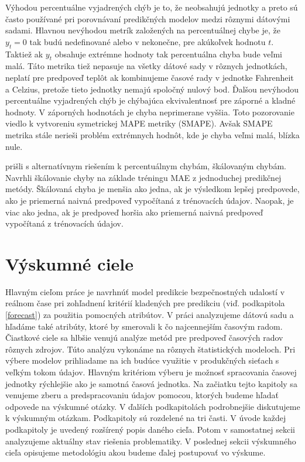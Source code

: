 \documentclass[thesismargins, thesislinespacing, openright, upjsfrontpage, combineabstracts]{rnthesis}
\begin{document}
Výhodou percentuálne vyjadrených chýb je to, že neobsahujú jednotky a preto sú často používané pri porovnávaní predikčných modelov medzi rôznymi dátovými sadami. Hlavnou nevýhodou metrík založených na percentuálnej chybe je, že $y_{t} = 0$ tak budú nedefinované alebo v nekonečne, pre akúkoľvek hodnotu $t$. Taktiež ak $y_{t}$ obsahuje extrémne hodnoty tak percentuálna chyba bude veľmi malá. Táto metrika tiež nepasuje na všetky dátové sady v rôznych jednotkách, neplatí pre predpoveď teplôt ak kombinujeme časové rady v jednotke Fahrenheit a Celzius, pretože tieto jednotky nemajú spoločný nulový bod. Ďalšou nevýhodou percentuálne vyjadrených chýb je chýbajúca ekvivalentnosť pre záporné a kladné hodnoty. V záporných hodnotách je chyba neprimerane vyššia. Toto pozorovanie viedlo k vytvoreniu symetrickej MAPE metriky \cite{armstrong1985crystal} (SMAPE). Avšak SMAPE metrika stále nerieši problém extrémnych hodnôt, kde je chyba veľmi malá, blízka nule. 

\cite{hyndman2006another} prišli s alternatívnym riešením k percentuálnym chybám, škálovaným chybám. Navrhli škálovanie chyby na základe tréningu MAE z jednoduchej predikčnej metódy. Škálovaná chyba je menšia ako jedna, ak je výsledkom lepšej predpovede, ako je priemerná naivná predpoveď vypočítaná z trénovacích údajov. Naopak, je viac ako jedna, ak je predpoveď horšia ako priemerná naivná predpoveď vypočítaná z trénovacích údajov.



\chapter{Výskumné ciele}

Hlavným cieľom práce je navrhnúť model predikcie bezpečnostných udalostí v reálnom čase pri zohľadnení kritérií kladených pre predikciu (viď. podkapitola \ref{forecast}) za použitia pomocných atribútov. V práci analyzujeme dátovú sadu a hľadáme také atribúty, ktoré by smerovali k čo najcennejším časovým radom. Čiastkové ciele sa hlbšie venujú analýze metód pre predpoveď časových radov rôznych zdrojov. Túto analýzu vykonáme na rôznych štatistických modeloch. Pri výbere modelov prihliadame na ich budúce využitie v produkčných sieťach s veľkým tokom údajov. Hlavným kritériom výberu je možnosť spracovania časovej jednotky rýchlejšie ako je samotná časová jednotka. Na začiatku tejto kapitoly sa venujeme zberu a predspracovaniu údajov pomocou, ktorých budeme hľadať odpovede na výskumné otázky. V ďalších podkapitolách podrobnejšie diskutujeme k výskumným otázkam. Podkapitoly sú rozdelené na tri časti. V úvode každej podkapitoly je uvedený rozšírený popis daného cieľa. Potom v samostatnej sekcii analyzujeme aktuálny stav riešenia problematiky. V poslednej sekcii výskumného cieľa opisujeme metodológiu akou budeme ďalej postupovať vo výskume. 
\end{document}

